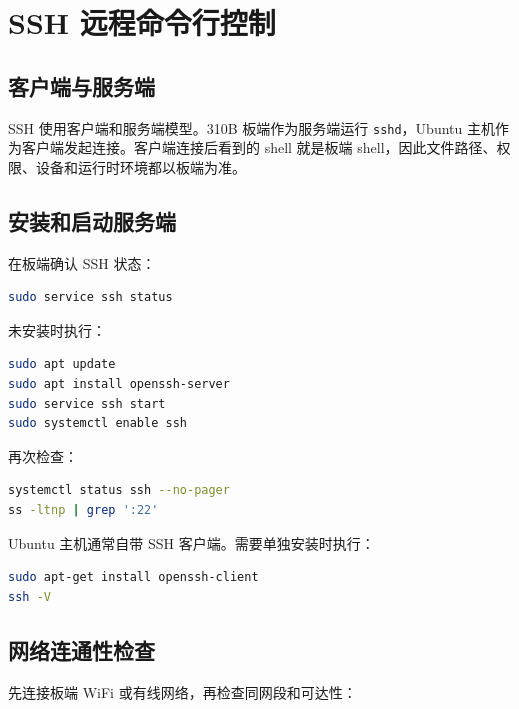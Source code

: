 \section{SSH
远程命令行控制}\label{ssh-ux8fdcux7a0bux547dux4ee4ux884cux63a7ux5236}

\subsection{客户端与服务端}\label{ux5ba2ux6237ux7aefux4e0eux670dux52a1ux7aef}

SSH 使用客户端和服务端模型。310B 板端作为服务端运行
\passthrough{\lstinline!sshd!}，Ubuntu
主机作为客户端发起连接。客户端连接后看到的 shell 就是板端
shell，因此文件路径、权限、设备和运行时环境都以板端为准。

\subsection{安装和启动服务端}\label{ux5b89ux88c5ux548cux542fux52a8ux670dux52a1ux7aef}

在板端确认 SSH 状态：

\begin{lstlisting}[language=bash]
sudo service ssh status
\end{lstlisting}

未安装时执行：

\begin{lstlisting}[language=bash]
sudo apt update
sudo apt install openssh-server
sudo service ssh start
sudo systemctl enable ssh
\end{lstlisting}

再次检查：

\begin{lstlisting}[language=bash]
systemctl status ssh --no-pager
ss -ltnp | grep ':22'
\end{lstlisting}

Ubuntu 主机通常自带 SSH 客户端。需要单独安装时执行：

\begin{lstlisting}[language=bash]
sudo apt-get install openssh-client
ssh -V
\end{lstlisting}

\subsection{网络连通性检查}\label{ux7f51ux7edcux8fdeux901aux6027ux68c0ux67e5}

先连接板端 WiFi 或有线网络，再检查同网段和可达性：

